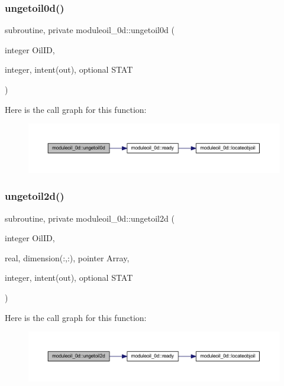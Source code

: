 \subsubsection{\texorpdfstring{ungetoil0d()}{ungetoil0d()}}
{\footnotesize\ttfamily subroutine, private moduleoil\+\_\+0d\+::ungetoil0d (\begin{DoxyParamCaption}\item[{integer}]{Oil\+ID,  }\item[{integer, intent(out), optional}]{S\+T\+AT }\end{DoxyParamCaption})\hspace{0.3cm}{\ttfamily [private]}}

Here is the call graph for this function\+:\nopagebreak
\begin{figure}[H]
\begin{center}
\leavevmode
\includegraphics[width=350pt]{namespacemoduleoil__0d_a5e491438effacee8f245a2f293ac1cd5_cgraph}
\end{center}
\end{figure}
\mbox{\label{namespacemoduleoil__0d_a2a561dff5ba878c524c927808595b674}} 
\subsubsection{\texorpdfstring{ungetoil2d()}{ungetoil2d()}}
{\footnotesize\ttfamily subroutine, private moduleoil\+\_\+0d\+::ungetoil2d (\begin{DoxyParamCaption}\item[{integer}]{Oil\+ID,  }\item[{real, dimension(\+:,\+:), pointer}]{Array,  }\item[{integer, intent(out), optional}]{S\+T\+AT }\end{DoxyParamCaption})\hspace{0.3cm}{\ttfamily [private]}}

Here is the call graph for this function\+:\nopagebreak
\begin{figure}[H]
\begin{center}
\leavevmode
\includegraphics[width=350pt]{namespacemoduleoil__0d_a2a561dff5ba878c524c927808595b674_cgraph}
\end{center}
\end{figure}
\mbox{\label{namespacemoduleoil__0d_aed2374d490605ee4791762d23340c037}} 
